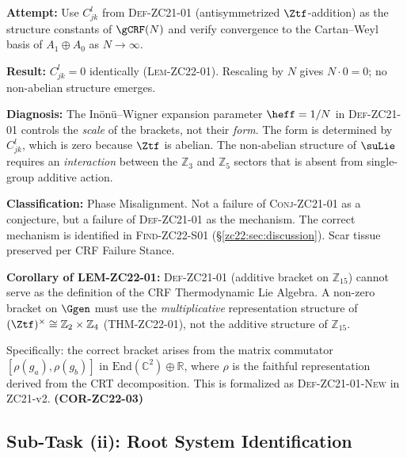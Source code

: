 \documentclass[12pt, a4paper]{article}
\begin{document}
\begin{formalbox}[title={PM-ZC22-S01: Naive Antisymmetrization Cannot
  Produce $\suLie$ Structure Constants}]
\textbf{Attempt:} Use $C_{jk}^l$ from \textsc{Def-ZC21-01}
(antisymmetrized $\Ztf$-addition) as the structure constants
of $\gCRF(N)$ and verify convergence to the
Cartan--Weyl basis of $A_1 \oplus A_0$ as $N\to\infty$.

\textbf{Result:} $C_{jk}^l = 0$ identically (\textsc{Lem-ZC22-01}).
Rescaling by $N$ gives $N \cdot 0 = 0$; no non-abelian structure emerges.

\textbf{Diagnosis:} The Inönü--Wigner expansion parameter $\heff = 1/N$
in \textsc{Def-ZC21-01} controls the \emph{scale} of the brackets,
not their \emph{form}. The form is determined by $C_{jk}^l$,
which is zero because $\Ztf$ is abelian.
The non-abelian structure of $\suLie$ requires an \emph{interaction}
between the $\mathbb{Z}_3$ and $\mathbb{Z}_5$ sectors that is absent
from single-group additive action.

\textbf{Classification:} Phase Misalignment.
Not a failure of \textsc{Conj-ZC21-01} as a conjecture,
but a failure of \textsc{Def-ZC21-01} as the mechanism.
The correct mechanism is identified in \textsc{Find-ZC22-S01} (\S\ref{zc22:sec:discussion}).
Scar tissue preserved per CRF Failure Stance.
\end{formalbox}

\begin{derivedbox}[title={COR-ZC22-03 (NEW v2): Multiplicative Representation Required}]
\label{zc22:cor:zc22-03}
\textbf{Corollary of LEM-ZC22-01:}
\textsc{Def-ZC21-01} (additive bracket on $\mathbb{Z}_{15}$) cannot serve
as the definition of the CRF Thermodynamic Lie Algebra.
A non-zero bracket on $\Ggen$ must use the \emph{multiplicative}
representation structure of $(\Ztf)^\times \cong \mathbb{Z}_2\times\mathbb{Z}_4$
(THM-ZC22-01), not the additive structure of $\mathbb{Z}_{15}$.

Specifically: the correct bracket arises from the matrix commutator
$[\rho(g_a),\rho(g_b)]$ in $\mathrm{End}(\mathbb{C}^2)\oplus\mathbb{R}$,
where $\rho$ is the faithful representation derived from the CRT decomposition.
This is formalized as \textsc{Def-ZC21-01-New} in ZC21-v2.
\hfill\textbf{(COR-ZC22-03)}
\end{derivedbox}

\subsection{Sub-Task (ii): Root System Identification}
\label{zc22:sec:ii}
\end{document}
